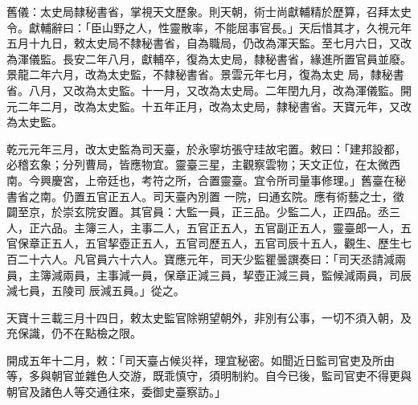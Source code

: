 \begin{pinyinscope}
 舊儀：太史局隸秘書省，掌視天文歷象。則天朝，術士尚獻輔精於歷算，召拜太史令。獻輔辭曰：「臣山野之人，性靈散率，不能屈事官長。」天后惜其才，久視元年五月十九日，敕太史局不隸秘書省，自為職局，仍改為渾天監。至七月六日，又改為渾儀監。長安二年八月，獻輔卒，復為太史局，隸秘書省，緣進所置官員並廢。景龍二年六月，改為太史監，不隸秘書省。景雲元年七月，復為太史
 局，隸秘書省。八月，又改為太史監。十一月，又改為太史局。二年閏九月，改為渾儀監。開元二年二月，改為太史監。十五年正月，改為太史局，隸秘書省。天寶元年，又改為太史監。



 乾元元年三月，改太史監為司天臺，於永寧坊張守珪故宅置。敕曰：「建邦設都，必稽玄象；分列曹局，皆應物宜。靈臺三星，主觀察雲物；天文正位，在太微西南。今興慶宮，上帝廷也，考符之所，合置靈臺。宜令所司量事修理。」舊臺在秘書省之南。仍置五官正五人。司天臺內別置
 一院，曰通玄院。應有術藝之士，徵闢至京，於崇玄院安置。其官員：大監一員，正三品。少監二人，正四品。丞三人，正六品。主簿三人，主事二人，五官正五人，五官副正五人，靈臺郎一人，五官保章正五人，五官挈壺正五人，五官司歷五人，五官司辰十五人，觀生、歷生七百二十六人。凡官員六十六人。寶應元年，司天少監瞿曇譔奏曰：「司天丞請減兩員，主簿減兩員，主事減一員，保章正減三員，挈壺正減三員，監候減兩員，司辰減七員，五陵司
 辰減五員。」從之。



 天寶十三載三月十四日，敕太史監官除朔望朝外，非別有公事，一切不須入朝，及充保識，仍不在點檢之限。



 開成五年十二月，敕：「司天臺占候災祥，理宜秘密。如聞近日監司官吏及所由等，多與朝官並雜色人交游，既乖慎守，須明制約。自今已後，監司官吏不得更與朝官及諸色人等交通往來，委御史臺察訪。」



\end{pinyinscope}